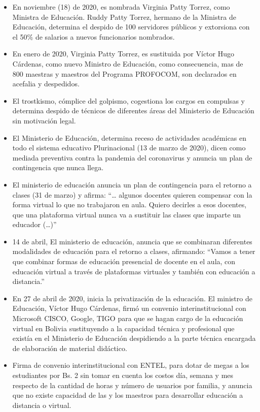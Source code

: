 \documentclass[a4paper, nobind]{templates/ociamthesis}
\begin{document}
\begin{itemize}
\item
  En noviembre (18) de 2020, es nombrada Virginia Patty Torrez, como Ministra de Educación. Ruddy Patty Torrez, hermano de la Ministra de Educación, determina el despido de 100 servidores públicos y extorsiona con el 50\% de salarios a nuevos funcionarios nombrados.
\item
  En enero de 2020, Virginia Patty Torrez, es sustituida por Víctor Hugo Cárdenas, como nuevo Ministro de Educación, como consecuencia, mas de 800 maestras y maestros del Programa PROFOCOM, son declarados en acefalia y despedidos.
\item
  El trostkismo, cómplice del golpismo, cogestiona los cargos en compulsas y determina despido de técnicos de diferentes áreas del Ministerio de Educación sin motivación legal.
\item
  El Ministerio de Educación, determina receso de actividades académicas en todo el sistema educativo Plurinacional (13 de marzo de 2020), dicen como mediada preventiva contra la pandemia del coronavirus y anuncia un plan de contingencia que nunca llega.
\item
  El ministerio de educación anuncia un plan de contingencia para el retorno a clases (31 de marzo) y afirma: ``\ldots{} algunos docentes quieren compensar con la forma virtual lo que no trabajaron en aula. Quiero decirles a esos docentes, que una plataforma virtual nunca va a sustituir las clases que imparte un educador (\ldots{})''
\item
  14 de abril, El ministerio de educación, anuncia que se combinaran diferentes modalidades de educación para el retorno a clases, afirmando: ``Vamos a tener que combinar formas de educación presencial de docente en el aula, con educación virtual a través de plataformas virtuales y también con educación a distancia.''
\item
  En 27 de abril de 2020, inicia la privatización de la educación. El ministro de Educación, Víctor Hugo Cárdenas, firmó un convenio interinstitucional con Microsoft CISCO, Google, TIGO para que se hagan cargo de la educación virtual en Bolivia sustituyendo a la capacidad técnica y profesional que existía en el Ministerio de Educación despidiendo a la parte técnica encargada de elaboración de material didáctico.
\item
  Firma de convenio interinstitucional con ENTEL, para dotar de megas a los estudiantes por Bs. 2 sin tomar en cuenta los costos día, semana y mes respecto de la cantidad de horas y número de usuarios por familia, y anuncia que no existe capacidad de las y los maestros para desarrollar educación a distancia o virtual.

\end{itemize}
\end{document}
